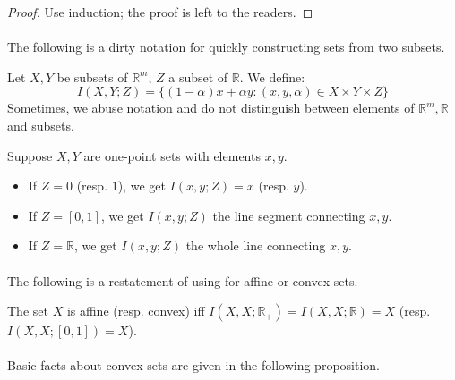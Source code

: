 \begin{proof}
	Use induction; the proof is left to the readers.
\end{proof}

\paragraph{}The following is a dirty notation for quickly constructing sets from two subsets.

\begin{defn}[$I(X,Y;Z)$]\label{defn:011-I}
	Let $X,Y$ be subsets of $\mathbb{R}^m$, $Z$ a subset of $\mathbb{R}$. We define:
	\[
		I(X,Y;Z)=\{(1-\alpha)x+\alpha y:(x,y,\alpha)\in X\times Y\times Z\}
	\]
	Sometimes, we abuse notation and do not distinguish between elements of $\mathbb{R}^m,\mathbb{R}$ and subsets.
\end{defn}

\begin{exmp}\label{defn:011-I-exmpl}
	Suppose $X,Y$ are one-point sets with elements $x, y$.
	\begin{itemize}
		\item If $Z=0$ (resp. $1$), we get $I(x,y;Z)=x$ (resp. $y$).
		\item If $Z=[0,1]$, we get $I(x,y;Z)$ the line segment connecting $x, y$.
		\item If $Z=\mathbb{R}$, we get $I(x,y;Z)$ the whole line connecting $x, y$.
	\end{itemize}
\end{exmp}

\paragraph{}The following is a restatement of  using  for affine or convex sets.

\begin{prop}The set $X$ is affine (resp. convex) iff $I(X,X;\mathbb{R}_{+})=I(X,X;\mathbb{R})=X$ (resp. $I(X,X;[0,1])=X$).
\end{prop}

\paragraph{}Basic facts about convex sets are given in the following proposition.

